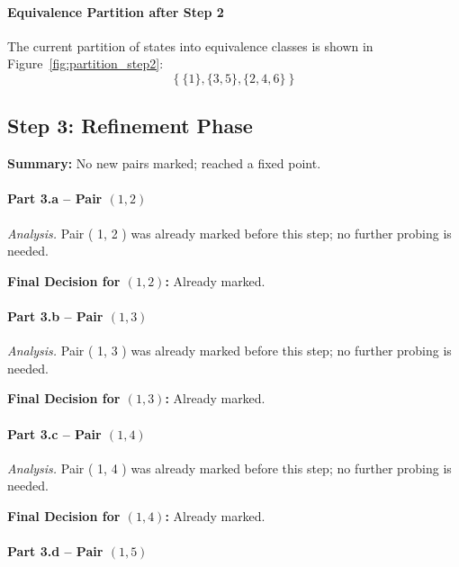 \documentclass{article}
\begin{document}
\paragraph{Equivalence Partition after Step 2}
The current partition of states into equivalence classes is shown in Figure~\ref{fig:partition_step2}:
\[
\left\{\{ 1 \}, \{ 3, 5 \}, \{ 2, 4, 6 \}\right\}
\]

\clearpage
\subsection*{Step 3: Refinement Phase}

\textbf{Summary:} No new pairs marked; reached a fixed point.


\paragraph{Part 3.a \;–\; Pair $( 1, 2 )$}

\emph{Analysis.} Pair ( 1, 2 ) was already marked before this step; no further probing is needed.

\noindent\textbf{Final Decision for $( 1, 2 )$:} Already marked.

\vspace{0.75em}
\paragraph{Part 3.b \;–\; Pair $( 1, 3 )$}

\emph{Analysis.} Pair ( 1, 3 ) was already marked before this step; no further probing is needed.

\noindent\textbf{Final Decision for $( 1, 3 )$:} Already marked.

\vspace{0.75em}
\paragraph{Part 3.c \;–\; Pair $( 1, 4 )$}

\emph{Analysis.} Pair ( 1, 4 ) was already marked before this step; no further probing is needed.

\noindent\textbf{Final Decision for $( 1, 4 )$:} Already marked.

\vspace{0.75em}
\paragraph{Part 3.d \;–\; Pair $( 1, 5 )$}
\end{document}
